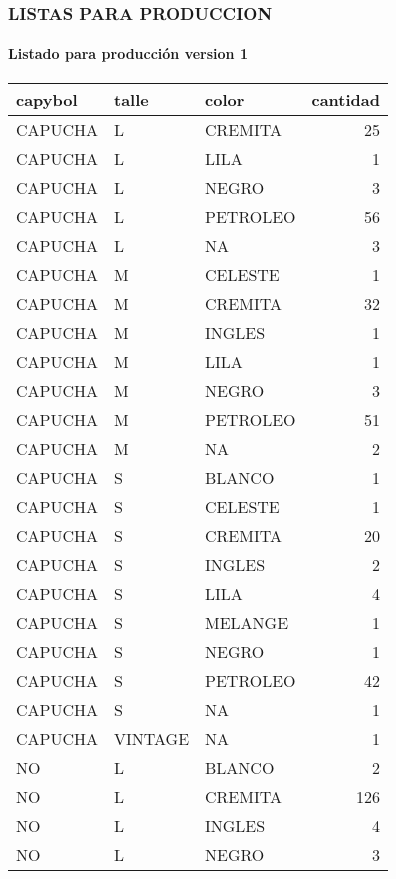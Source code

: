 \documentclass[
]{article}
\begin{document}
\hypertarget{listas-para-produccion}{%
\subsubsection{LISTAS PARA PRODUCCION}\label{listas-para-produccion}}

\hypertarget{listado-para-producciuxf3n-version-1}{%
\paragraph{Listado para producción version
1}\label{listado-para-producciuxf3n-version-1}}

\begin{longtable}[t]{lllr}
\toprule
capybol & talle & color & cantidad\\
\midrule
CAPUCHA & L & CREMITA & 25\\
CAPUCHA & L & LILA & 1\\
CAPUCHA & L & NEGRO & 3\\
CAPUCHA & L & PETROLEO & 56\\
CAPUCHA & L & NA & 3\\
\addlinespace
CAPUCHA & M & CELESTE & 1\\
CAPUCHA & M & CREMITA & 32\\
CAPUCHA & M & INGLES & 1\\
CAPUCHA & M & LILA & 1\\
CAPUCHA & M & NEGRO & 3\\
\addlinespace
CAPUCHA & M & PETROLEO & 51\\
CAPUCHA & M & NA & 2\\
CAPUCHA & S & BLANCO & 1\\
CAPUCHA & S & CELESTE & 1\\
CAPUCHA & S & CREMITA & 20\\
\addlinespace
CAPUCHA & S & INGLES & 2\\
CAPUCHA & S & LILA & 4\\
CAPUCHA & S & MELANGE & 1\\
CAPUCHA & S & NEGRO & 1\\
CAPUCHA & S & PETROLEO & 42\\
\addlinespace
CAPUCHA & S & NA & 1\\
CAPUCHA & VINTAGE & NA & 1\\
NO & L & BLANCO & 2\\
NO & L & CREMITA & 126\\
NO & L & INGLES & 4\\
\addlinespace
NO & L & NEGRO & 3\\

\end{longtable}
\end{document}
